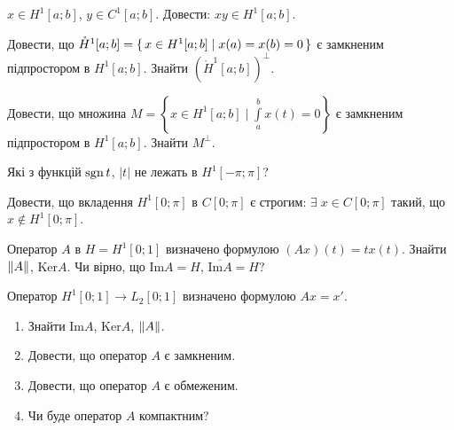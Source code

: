 \begin{exercise}
    $x \in H^1[a;b]$, $y \in C^1[a;b]$. Довести: $xy \in H^1[a;b]$.
\end{exercise}

\begin{exercise}
    Довести, що $\mathring{H}^1[a;b] = \set{x \in H^1[a;b] \mid x(a) = x(b) = 0}$
    є замкненим підпростором в $H^1[a;b]$. Знайти $\left(\mathring{H}^1[a;b]\right)^{\perp}$. 
\end{exercise}

\begin{exercise}
    Довести, що множина $M = \left\{ x \in H^1[a;b] \mid \int\limits_a^b x(t) = 0\right\}$
    є замкненим підпростором в $H^1[a;b]$. Знайти $M^{\perp}$.
\end{exercise}

\begin{exercise}
    Які з функцій $\operatorname{sgn} t$, $|t|$ не лежать в $H^1[-\pi; \pi]$?
\end{exercise}

\begin{exercise}
    Довести, що вкладення $H^1[0; \pi]$ в $C[0; \pi]$ є строгим:
    $\exists \; x \in C[0; \pi]$ такий, що $x \notin H^1[0;\pi]$.
\end{exercise}

\begin{exercise}
    Оператор $A$ в $H = H^1[0;1]$ визначено формулою $(Ax)(t) = t x(t)$.
    Знайти $\left\lVert A\right\rVert$, $\mathrm{Ker}{A}$. Чи вірно, що $\mathrm{Im}{A} = H$,
    $\overline{\mathrm{Im}{A}} = H$?
\end{exercise}

\begin{exercise}
    Оператор $H^1[0;1] \to L_2[0;1]$ визначено формулою $Ax = x'$.
    \begin{enumerate}
        \item Знайти $\mathrm{Im}{A}$, $\mathrm{Ker}{A}$, $\left\lVert A\right\rVert$.
        \item Довести, що оператор $A$ є замкненим.
        \item Довести, що оператор $A$ є обмеженим.
        \item Чи буде оператор $A$ компактним?
    \end{enumerate}
\end{exercise}